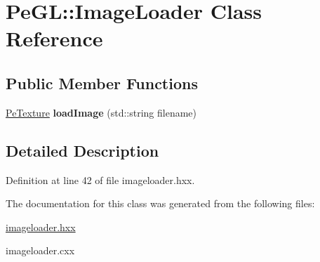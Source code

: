 \hypertarget{classPeGL_1_1ImageLoader}{\section{Pe\-G\-L\-:\-:Image\-Loader Class Reference}
\label{classPeGL_1_1ImageLoader}
}
\subsection*{Public Member Functions}
\begin{DoxyCompactItemize}
\item 
\hypertarget{classPeGL_1_1ImageLoader_aeb528e3bc635d7817fc477326e0d1e4a}{\hyperlink{structPeGL_1_1PeTexture}{Pe\-Texture} {\bfseries load\-Image} (std\-::string filename)}\label{classPeGL_1_1ImageLoader_aeb528e3bc635d7817fc477326e0d1e4a}

\end{DoxyCompactItemize}


\subsection{Detailed Description}


Definition at line 42 of file imageloader.\-hxx.



The documentation for this class was generated from the following files\-:\begin{DoxyCompactItemize}
\item 
\hyperlink{imageloader_8hxx}{imageloader.\-hxx}\item 
imageloader.\-cxx\end{DoxyCompactItemize}

